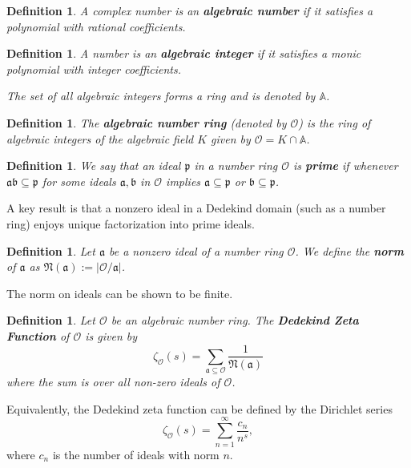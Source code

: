 \documentclass[12pt]{amsart}
\newtheorem{definition}[theorem]{Definition}
\theoremstyle{definition}
\newcommand{\f}[1]{\mathfrak{#1}}
\begin{document}
\begin{definition} A complex number is an \textbf{algebraic number} if it satisfies a polynomial with rational coefficients.
\end{definition}

\begin{definition}A number is an \textbf{algebraic integer} if it satisfies a monic polynomial with integer coefficients.
	
	The set of all algebraic integers forms a ring and is denoted by \(\mathbb{A}\).
\end{definition}

\begin{definition} The \textbf{algebraic number ring} (denoted by \(\mathcal{O}\)) is the ring of algebraic integers of the algebraic field \(K\) given by \(\mathcal{O}=K\cap \mathbb{A}\). 
\end{definition}

\begin{definition} 
	We say that an ideal \(\f{p}\) in a number ring $\mathcal{O}$ is \textbf{prime} if whenever \(\f{ab}\subseteq \f{p}\) for some ideals \(\f{a},\f{b}\) in $\mathcal{O}$ implies \(\f{a}\subseteq \f{p}\) or \(\f{b} \subseteq \f{p}\).  
\end{definition}
A key result is that a nonzero ideal in a Dedekind domain (such as a number ring) enjoys unique factorization into prime ideals. 

\begin{definition} \label{ideal-norm}
	Let $\mathfrak{a}$ be a nonzero ideal of a number ring $\mathcal{O}$. We
	define the \textbf{norm} of \(\f{a}\) as \(\f{N(a)}:=|\mathcal{O}/\f{a}|\).
\end{definition}

The norm on ideals can be shown to be finite. \cite{Marcus} 

\begin{definition} Let \(\mathcal{O}\) be an algebraic number ring. The \textbf{Dedekind Zeta Function} of \(\mathcal{O}\) is given by \begin{equation}
		\zeta_\mathcal{O}(s)=\sum_{\f{a\subseteq \mathcal{O}}}\frac{1}{\f{N(a)}}
	\end{equation} where the sum is over all non-zero ideals of \(\mathcal{O}\).
\end{definition}

Equivalently, the Dedekind zeta function can be defined by the Dirichlet series
$$\zeta_\mathcal{O}(s)=\sum_{n=1}^{\infty}\frac{c_n}{n^s},$$
where \(c_n\) is the number of ideals with norm \(n\).
\end{document}
